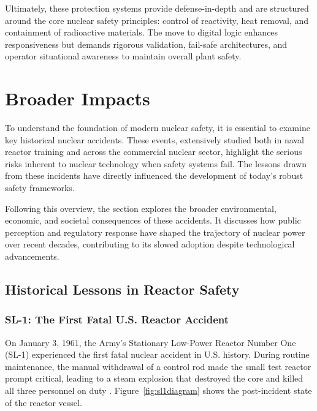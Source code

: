 \documentclass[12pt]{article}
\begin{document}
Ultimately, these protection systems provide defense-in-depth and are structured around the core nuclear safety principles: control of reactivity, heat removal, and containment of radioactive materials. The move to digital logic enhances responsiveness but demands rigorous validation, fail-safe architectures, and operator situational awareness to maintain overall plant safety.

\section{Broader Impacts}
To understand the foundation of modern nuclear safety, it is essential to examine key historical nuclear accidents. These events, extensively studied both in naval reactor training and across the commercial nuclear sector, highlight the serious risks inherent to nuclear technology when safety systems fail. The lessons drawn from these incidents have directly influenced the development of today’s robust safety frameworks.

Following this overview, the section explores the broader environmental, economic, and societal consequences of these accidents. It discusses how public perception and regulatory response have shaped the trajectory of nuclear power over recent decades, contributing to its slowed adoption despite technological advancements.

\subsection{Historical Lessons in Reactor Safety}
\label{sec:accidents}

\subsubsection*{SL-1: The First Fatal U.S. Reactor Accident}

On January 3, 1961, the Army’s Stationary Low-Power Reactor Number One (SL-1) experienced the first fatal nuclear accident in U.S. history. During routine maintenance, the manual withdrawal of a control rod made the small test reactor prompt critical, leading to a steam explosion that destroyed the core and killed all three personnel on duty \autocite{sl1report}. Figure~\ref{fig:sl1diagram} shows the post-incident state of the reactor vessel.
\end{document}
